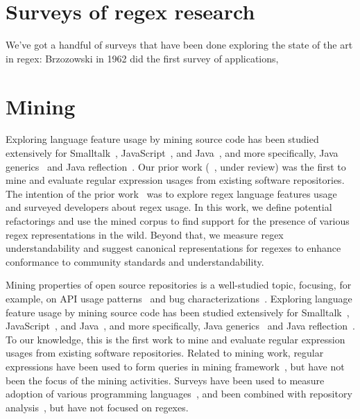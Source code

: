 \section{Surveys of regex research}

 We've got a handful of surveys that have been done exploring the state of the art in regex: Brzozowski in 1962 did the first survey of applications,

\section{Mining}


Exploring language feature usage by mining source code has been studied extensively for
Smalltalk~\cite{Callau:2011:DUD:1985441.1985448},
JavaScript~\cite{Richards:2010:ADB:1809028.1806598},
and Java~\cite{Dyer:2014:MBA:2568225.2568295, Grechanik:2010:EIL:1852786.1852801, Parnin:2013:AUJ:2589712.2589717, Livshits:2005:RAJ:2099708.2099724},
and more specifically,
Java generics~\cite{Parnin:2013:AUJ:2589712.2589717} and
Java reflection~\cite{Livshits:2005:RAJ:2099708.2099724}.
Our prior work (~\cite{chapman2016}, under review) was the first to mine and evaluate regular expression usages from existing software repositories. The intention of the prior work~\cite{chapman2016} was to explore regex language features  usage and surveyed developers about regex usage. In this work, we define potential refactorings and use the mined corpus to find support for the presence of various regex representations in the wild. Beyond that, we measure regex understandability and suggest canonical representations for regexes to enhance conformance to community standards and understandability.

Mining properties of open source repositories is a well-studied topic, focusing, for example, on API usage patterns~\cite{Linares-Vasquez:2014:MEA:2597073.2597085} and bug characterizations~\cite{Chen:2014:ESD:2597073.2597108}.
Exploring language feature usage by mining source code has been studied extensively for
Smalltalk~\cite{Callau:2011:DUD:1985441.1985448, Callau:2013:DUD:2589712.2589718},
JavaScript~\cite{Richards:2010:ADB:1809028.1806598},
and Java~\cite{Dyer:2014:MBA:2568225.2568295, Grechanik:2010:EIL:1852786.1852801, Parnin:2013:AUJ:2589712.2589717, Livshits:2005:RAJ:2099708.2099724},
and more specifically,
Java generics~\cite{Parnin:2013:AUJ:2589712.2589717} and
Java reflection~\cite{Livshits:2005:RAJ:2099708.2099724}.
To our knowledge, this is the first work to mine and evaluate regular expression usages from existing software repositories. Related to mining work, regular expressions have been used to form queries in mining framework~\cite{Begel:2010:CDE:1806799.1806821}, but have not been the focus of the mining activities.
Surveys have been used to measure adoption of various programming languages~\cite{Meyerovich:2013:EAP:2509136.2509515, Dattero:2004:PLG:962081.962087}, and been combined with  repository analysis~\cite{Meyerovich:2013:EAP:2509136.2509515}, but have not focused on regexes.


